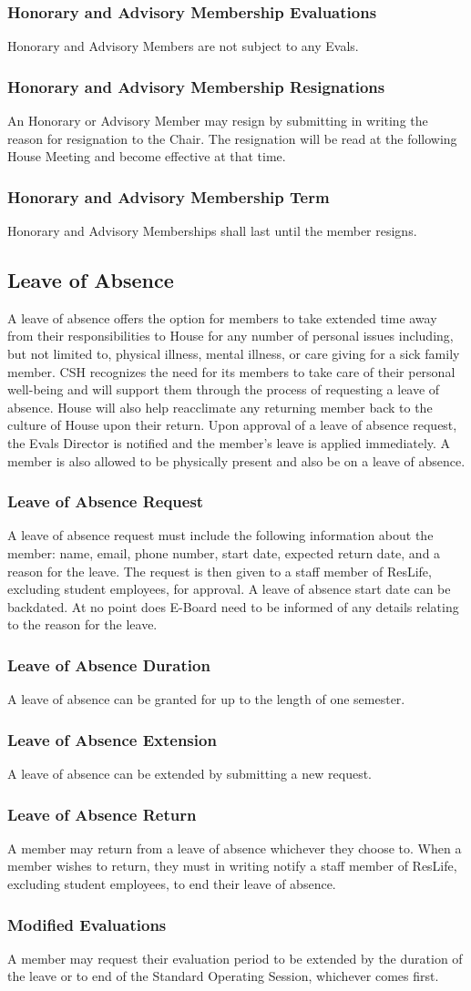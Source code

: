 \documentclass{article}
\newcommand{\asection}[1]{\subsection{#1} \label{#1}}
\newcommand{\asubsection}[1]{\subsubsection{#1} \label{#1}}
\begin{document}
\asubsection{Honorary and Advisory Membership Evaluations}
Honorary and Advisory Members are not subject to any Evals.

\asubsection{Honorary and Advisory Membership Resignations}
An Honorary or Advisory Member may resign by submitting in writing the reason for resignation to the Chair.
The resignation will be read at the following House Meeting and become effective at that time.

\asubsection{Honorary and Advisory Membership Term}
Honorary and Advisory Memberships shall last until the member resigns.

\asection{Leave of Absence}
A leave of absence offers the option for members to take extended time away from their responsibilities to House for any number of personal issues including, but not limited to, physical illness, mental illness, or care giving for a sick family member.
CSH recognizes the need for its members to take care of their personal well-being and will support them through the process of requesting a leave of absence.
House will also help reacclimate any returning member back to the culture of House upon their return.
Upon approval of a leave of absence request, the Evals Director is notified and the member's leave is applied immediately.
A member is also allowed to be physically present and also be on a leave of absence.

\asubsection{Leave of Absence Request}
A leave of absence request must include the following information about the member: name, email, phone number, start date, expected return date, and a reason for the leave.
The request is then given to a staff member of ResLife, excluding student employees, for approval.
A leave of absence start date can be backdated.
At no point does E-Board need to be informed of any details relating to the reason for the leave.

\asubsection{Leave of Absence Duration}
A leave of absence can be granted for up to the length of one semester.

\asubsection{Leave of Absence Extension}
A leave of absence can be extended by submitting a new request.

\asubsection{Leave of Absence Return}
A member may return from a leave of absence whichever they choose to.
When a member wishes to return, they must in writing notify a staff member of ResLife, excluding student employees, to end their leave of absence.

\asubsection{Modified Evaluations}
A member may request their evaluation period to be extended by the duration of the leave or to end of the Standard Operating Session, whichever comes first.
\end{document}
